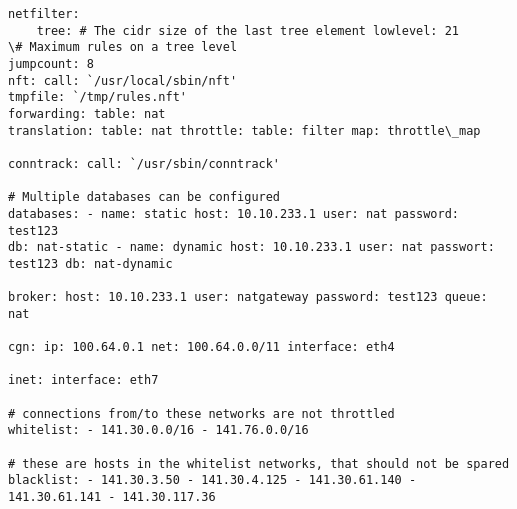 \documentclass{report}
\begin{document}
\begin{verbatim}
netfilter: 
	tree: # The cidr size of the last tree element lowlevel: 21
\# Maximum rules on a tree level 
jumpcount: 8 
nft: call: `/usr/local/sbin/nft'
tmpfile: `/tmp/rules.nft'
forwarding: table: nat
translation: table: nat throttle: table: filter map: throttle\_map

conntrack: call: `/usr/sbin/conntrack'

# Multiple databases can be configured
databases: - name: static host: 10.10.233.1 user: nat password: test123
db: nat-static - name: dynamic host: 10.10.233.1 user: nat passwort:
test123 db: nat-dynamic

broker: host: 10.10.233.1 user: natgateway password: test123 queue: nat

cgn: ip: 100.64.0.1 net: 100.64.0.0/11 interface: eth4

inet: interface: eth7

# connections from/to these networks are not throttled
whitelist: - 141.30.0.0/16 - 141.76.0.0/16

# these are hosts in the whitelist networks, that should not be spared
blacklist: - 141.30.3.50 - 141.30.4.125 - 141.30.61.140 - 141.30.61.141 - 141.30.117.36
\end{verbatim}


{}

\end{document}
